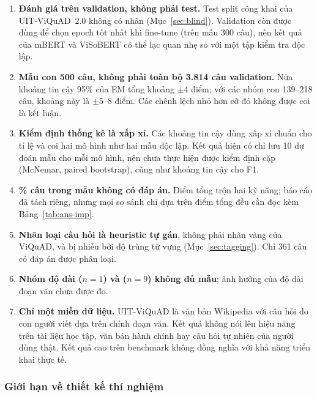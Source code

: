 \begin{enumerate}
  \item \textbf{Đánh giá trên validation, không phải test.} Test split công khai của UIT-ViQuAD~2.0
        không có nhãn (Mục~\ref{sec:blind}). Validation còn được dùng để chọn epoch tốt nhất khi
        fine-tune (trên mẫu 300 câu), nên kết quả của mBERT và ViSoBERT có thể lạc quan nhẹ so với
        một tập kiểm tra độc lập.
  \item \textbf{Mẫu con 500 câu, không phải toàn bộ 3.814 câu validation.} Nửa khoảng tin cậy 95\%
        của EM tổng khoảng $\pm$4 điểm; với các nhóm con 139--218 câu, khoảng này là $\pm$5--8
        điểm. Các chênh lệch nhỏ hơn cỡ đó không được coi là kết luận.
  \item \textbf{Kiểm định thống kê là xấp xỉ.} Các khoảng tin cậy dùng xấp xỉ chuẩn cho tỉ lệ và
        coi hai mô hình như hai mẫu độc lập. Kết quả hiện có chỉ lưu 10 dự đoán mẫu cho mỗi mô hình,
        nên chưa thực hiện được kiểm định cặp (McNemar, paired bootstrap), cũng như khoảng tin cậy
        cho F1.
  \item \textbf{\dataHistImpPct{}\% câu trong mẫu không có đáp án.} Điểm tổng trộn hai kỹ năng; báo cáo đã tách
        riêng, nhưng mọi so sánh chỉ dựa trên điểm tổng đều cần đọc kèm Bảng~\ref{tab:ans-imp}.
  \item \textbf{Nhãn loại câu hỏi là heuristic tự gán}, không phải nhãn vàng của ViQuAD, và bị
        nhiễu bởi độ trùng từ vựng (Mục~\ref{sec:tagging}). Chỉ 361 câu có đáp án được phân loại.
  \item \textbf{Nhóm độ dài  ($n = 1$) và  ($n = 9$) không đủ mẫu}; ảnh hưởng
        của độ dài đoạn văn chưa được đo.
  \item \textbf{Chỉ một miền dữ liệu.} UIT-ViQuAD là văn bản Wikipedia với câu hỏi do con người
        viết dựa trên chính đoạn văn. Kết quả không nói lên hiệu năng trên tài liệu học tập, văn
        bản hành chính hay câu hỏi tự nhiên của người dùng thật. Kết quả cao trên benchmark không
        đồng nghĩa với khả năng triển khai thực tế.
\end{enumerate}

\subsubsection{Giới hạn về thiết kế thí nghiệm}

